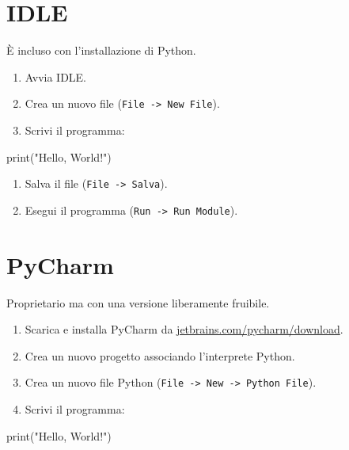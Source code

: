 \documentclass[
  letterpaper,
]{scrbook}
\newenvironment{Shaded}{\begin{snugshade}}{\end{snugshade}}
\newcommand{\BuiltInTok}[1]{\textcolor[rgb]{0.00,0.23,0.31}{#1}}
\newcommand{\NormalTok}[1]{\textcolor[rgb]{0.00,0.23,0.31}{#1}}
\newcommand{\StringTok}[1]{\textcolor[rgb]{0.13,0.47,0.30}{#1}}
\begin{document}
\section{IDLE}

È incluso con l'installazione di Python.

\begin{enumerate}
\def\labelenumi{\arabic{enumi}.}
\item
  Avvia IDLE.
\item
  Crea un nuovo file (\texttt{File\ -\textgreater{}\ New\ File}).
\item
  Scrivi il programma:
\end{enumerate}

\begin{Shaded}
\begin{Highlighting}[]
\BuiltInTok{print}\NormalTok{(}\StringTok{"Hello, World!"}\NormalTok{)}
\end{Highlighting}
\end{Shaded}

\begin{enumerate}
\def\labelenumi{\arabic{enumi}.}
\setcounter{enumi}{3}
\item
  Salva il file (\texttt{File\ -\textgreater{}\ Salva}).
\item
  Esegui il programma (\texttt{Run\ -\textgreater{}\ Run\ Module}).
\end{enumerate}

\section{PyCharm}

Proprietario ma con una versione liberamente fruibile.

\begin{enumerate}
\def\labelenumi{\arabic{enumi}.}
\item
  Scarica e installa PyCharm da
  \href{https://www.jetbrains.com/pycharm/download/}{jetbrains.com/pycharm/download}.
\item
  Crea un nuovo progetto associando l'interprete Python.
\item
  Crea un nuovo file Python
  (\texttt{File\ -\textgreater{}\ New\ -\textgreater{}\ Python\ File}).
\item
  Scrivi il programma:
\end{enumerate}

\begin{Shaded}
\begin{Highlighting}[]
\BuiltInTok{print}\NormalTok{(}\StringTok{"Hello, World!"}\NormalTok{)}
\end{Highlighting}
\end{Shaded}
\end{document}
